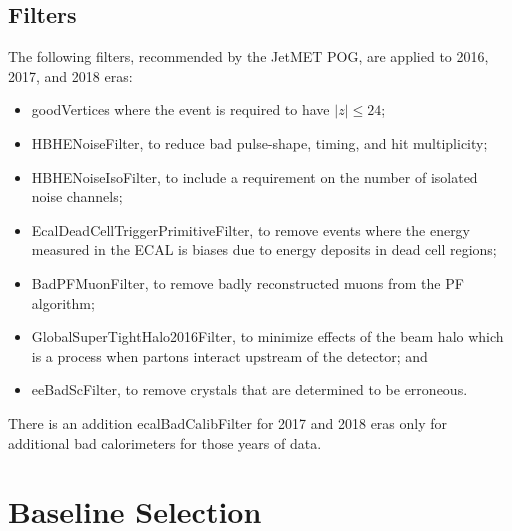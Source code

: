 \subsection{Filters}
The following filters, recommended by the JetMET POG, are applied to 2016, 2017, and 2018 eras:
\begin{itemize}
	\item goodVertices where the event is required to have $|z|\leq24$;
	\item HBHENoiseFilter, to reduce bad pulse-shape, timing, and hit multiplicity;
	\item HBHENoiseIsoFilter, to include a requirement on the number of isolated noise channels;
	\item EcalDeadCellTriggerPrimitiveFilter, to remove events where the energy measured in the ECAL is biases due to energy deposits in dead cell regions;
	\item BadPFMuonFilter, to remove badly reconstructed muons from the PF algorithm;
	\item GlobalSuperTightHalo2016Filter, to minimize effects of the beam halo which is a process when partons interact upstream of the detector; and
	\item eeBadScFilter, to remove crystals that are determined to be erroneous.
\end{itemize}
There is an addition ecalBadCalibFilter for 2017 and 2018 eras only for additional bad calorimeters for those years of data.

\section{Baseline Selection} \label{sec:Baseline}

